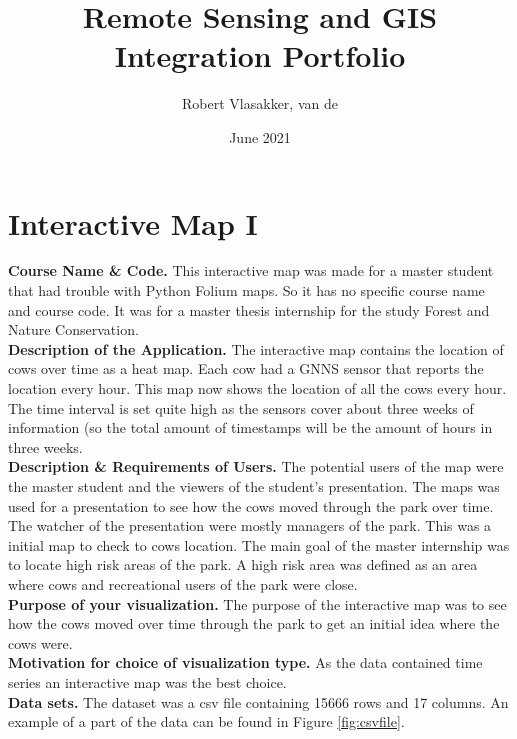 \documentclass{article}
\title{Remote Sensing and GIS Integration Portfolio}
\author{Robert Vlasakker, van de}
\date{June 2021}
\begin{document}
\maketitle

\section{Interactive Map I}
\textbf{Course Name \& Code.}
This interactive map was made for a master student that had trouble with Python Folium maps. 
So it has no specific course name and course code. 
It was for a master thesis internship for the study Forest and Nature Conservation.
\\

\noindent
\textbf{Description of the Application.}
The interactive map contains the location of cows over time as a heat map. 
Each cow had a GNNS sensor that reports the location every hour.
This map now shows the location of all the cows every hour. 
The time interval is set quite high as the sensors cover about three weeks of information (so the total amount of timestamps will be the amount of hours in three weeks.
\\

\noindent
\textbf{Description \& Requirements of Users.}
The potential users of the map were the master student and the viewers of the student's presentation.
The maps was used for a presentation to see how the cows moved through the park over time.
The watcher of the presentation were mostly managers of the park. 
This was a initial map to check to cows location. 
The main goal of the master internship was to locate high risk areas of the park.
A high risk area was defined as an area where cows and recreational users of the park were close.
\\

\noindent
\textbf{Purpose of your visualization.}
The purpose of the interactive map was to see how the cows moved over time through the park to get an initial idea where the cows were.
\\

\noindent
\textbf{Motivation for choice of visualization type.}
As the data contained time series an interactive map was the best choice. 
\\

\noindent
\textbf{Data sets.}
The dataset was a csv file containing 15666 rows and 17 columns.
An example of a part of the data can be found in Figure \ref{fig:csvfile}.
\\
\end{document}
